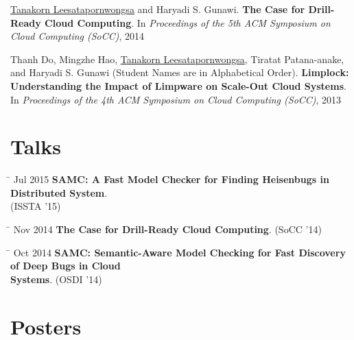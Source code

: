 \documentclass[10pt]{article} %
\begin{document}
\underline{Tanakorn Leesatapornwongsa} and Haryadi S. Gunawi. \textbf{The Case
for Drill-Ready Cloud Computing}. In \textit{Proceedings of the 5th ACM
Symposium on Cloud Computing (SoCC)}, 2014
\vspace{2mm}

Thanh Do, Mingzhe Hao, \underline{Tanakorn Leesatapornwongsa}, Tiratat
Patana-anake, and Haryadi S. Gunawi (Student Names are in Alphabetical Order).
\textbf{Limplock: Understanding the Impact of Limpware on Scale-Out Cloud
Systems}. In \textit{Proceedings of the 4th ACM Symposium on Cloud Computing
(SoCC)}, 2013


\section{Talks}

\begin{tabbing}
\hspace{2.5cm} \= \kill
Jul 2015 \> \textbf{SAMC: A Fast Model Checker for Finding Heisenbugs in Distributed System}. \\
\> (ISSTA '15)
\end{tabbing}

\begin{tabbing}
\hspace{2.5cm} \= \kill
Nov 2014 \> \textbf{The Case for Drill-Ready Cloud Computing}. (SoCC '14)
\end{tabbing}

\begin{tabbing}
\hspace{2.5cm} \= \kill
Oct 2014 \> \textbf{SAMC: Semantic-Aware Model Checking for Fast Discovery of Deep Bugs in 
Cloud} \\
\> \textbf{Systems}. (OSDI '14)
\end{tabbing}


\section{Posters}
\end{document}
